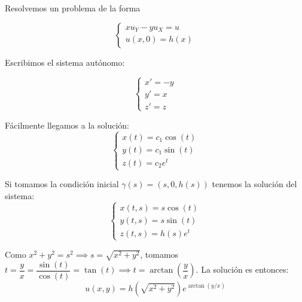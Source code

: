 \documentclass[openany]{book}
\begin{document}
\begin{example}
  Resolvemos un problema de la forma

  $$ \left\{
  \begin{array}{l}
    x u_{Y} - y u_{X} = u\\ 
    u(x,0) = h(x)
  \end{array}
  \right. $$

  Escribimos el sistema autónomo:

  $$ \left\{
  \begin{array}{l}
    x' = -y\\ 
    y' = x\\ 
    z' = z
  \end{array}
  \right. $$

  Fácilmente llegamos a la solución:
  $$ \left\{
  \begin{array}{l}
    x(t) = c_1 \cos(t)\\ 
    y(t) = c_1 \sin(t)\\ 
    z(t) = c_2 e^{t}
  \end{array}
  \right. $$

  Si tomamos la condición inicial $ \gamma (s) = (s,0,h(s)) $ tenemos la solución del sistema:
  $$ 
  \left\{
  \begin{array}{l}
    x(t,s) = s \cos(t) \\ 
    y(t,s) = s \sin(t) \\ 
    z(t,s) = h(s) e^{t}
  \end{array}
  \right.
  $$

  Como $ x^2 +y ^2 = s ^2 \implies s = \sqrt{x^2+y^2} $, tomamos $ t = \dfrac{y}{x} = \dfrac{\sin(t)}{\cos(t)} = \tan(t) \implies t = \arctan(\dfrac{y}{x}) $. La solución es entonces:
  $$ u(x,y) = h(\sqrt{x^2+y^2})e ^{\arctan(y/x)} $$
\end{example}
\end{document}
